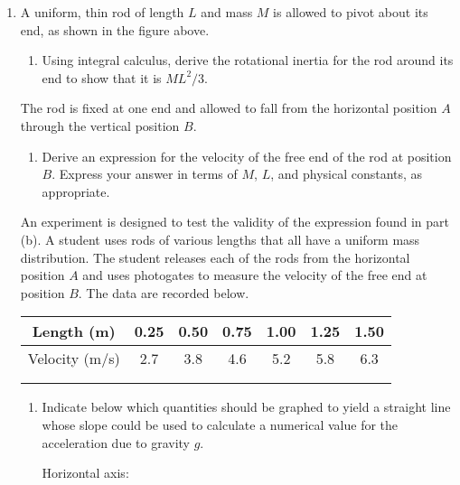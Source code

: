 \documentclass{../../../oss-apphys}
\begin{document}
\begin{enumerate}
\item A uniform, thin rod of length $L$ and mass $M$ is allowed to pivot about
  its end, as shown in the figure above.
  \begin{enumerate}[leftmargin=15pt]
  \item Using integral calculus, derive the rotational inertia for the rod
    around its end to show that it is $ML^2/3$.
  \end{enumerate}
  The rod is fixed at one end and allowed to fall from the horizontal
  position $A$ through the vertical position $B$.
  \begin{enumerate}[resume]
  \item Derive an expression for the velocity of the free end of the rod at
    position $B$. Express your answer in terms of $M$, $L$, and physical
    constants, as appropriate.
  \end{enumerate}
  \newpage
  An experiment is designed to test the validity of the expression found in
  part (b). A student uses rods of various lengths that all have a uniform
  mass distribution. The student releases each of the rods from the horizontal
  position $A$ and uses photogates to measure the velocity of the free end at
  position $B$. The data are recorded below.
  \begin{center}
    \def\arraystretch{1.45}
    \begin{tabular}{|c|c|c|c|c|c|c|}
      \hline
      Length (m)     & 0.25 & 0.50 & 0.75 & 1.00 & 1.25 & 1.50\\\hline
      Velocity (m/s) & 2.7  & 3.8  & 4.6  & 5.2  & 5.8  & 6.3 \\\hline
      & & & & & & \\\hline
      & & & & & & \\\hline
    \end{tabular}
    \def\arraystretch{1}
  \end{center}
  \begin{enumerate}[resume]
  \item Indicate below which quantities should be graphed to yield a straight
    line whose slope could be used to calculate a numerical value for the
    acceleration due to gravity $g$.

    \vspace{.1in}Horizontal axis: \underline{\hspace{1in}}


\end{enumerate}
\end{enumerate}
\end{document}
